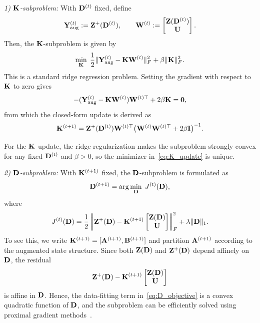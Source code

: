 \textit{1) $\mathbf{K}$-subproblem:}
With $\mathbf{D}^{(t)}$ fixed, define
\[
\mathbf{Y}_{\mathrm{aug}}^{(t)} := \mathbf{Z}^+(\mathbf{D}^{(t)}), \qquad
\mathbf{W}^{(t)} :=
\begin{bmatrix}
\mathbf{Z}(\mathbf{D}^{(t)}) \\ \mathbf{U}
\end{bmatrix}.
\]
Then, the $\mathbf{K}$-subproblem is given by
\[
\min_{\mathbf{K}} \;
\frac{1}{2}\|\mathbf{Y}_{\mathrm{aug}}^{(t)}
- \mathbf{K} \mathbf{W}^{(t)}\|_F^2
+ \beta\|\mathbf{K}\|_F^2 .
\]
This is a standard ridge regression problem. Setting the gradient with respect to $\mathbf{K}$ to zero gives
\[
-(\mathbf{Y}_{\mathrm{aug}}^{(t)} - \mathbf{K} \mathbf{W}^{(t)})
\mathbf{W}^{(t)\top} + 2\beta\mathbf{K} = \mathbf{0},
\]
from which the closed-form update is derived as
\begin{equation}
\label{eq:K_update}
\mathbf{K}^{(t+1)}
= \mathbf{Z}^+(\mathbf{D}^{(t)}) \mathbf{W}^{(t)\top}
\bigl( \mathbf{W}^{(t)} \mathbf{W}^{(t)\top} + 2\beta \mathbf{I} \bigr)^{-1}.
\end{equation}

For the $\mathbf{K}$ update, the ridge regularization makes the subproblem strongly convex for any fixed $\mathbf{D}^{(t)}$ and $\beta>0$, so the minimizer in~\eqref{eq:K_update} is unique.

\textit{2) $\mathbf{D}$-subproblem:} With $\mathbf{K}^{(t+1)}$ fixed, the $\mathbf{D}$-subproblem is formulated as
\begin{equation}
\label{eq:D_subproblem}
\mathbf{D}^{(t+1)} = \arg\min_{\mathbf{D}} \; J^{(t)}(\mathbf{D}),
\end{equation}
where
\begin{equation}
\label{eq:D_objective}
J^{(t)}(\mathbf{D}) = \frac{1}{2}\left\| \mathbf{Z}^+(\mathbf{D}) - \mathbf{K}^{(t+1)}
\begin{bmatrix}
\mathbf{Z}(\mathbf{D}) \\ \mathbf{U}
\end{bmatrix} \right\|_F^2
+ \lambda\|\mathbf{D}\|_1.
\end{equation}
To see this, we write $\mathbf{K}^{(t+1)} = [\mathbf{A}^{(t+1)},\mathbf{B}^{(t+1)}]$ and partition $\mathbf{A}^{(t+1)}$ according to the augmented state structure. Since both $\mathbf{Z}(\mathbf{D})$ and $\mathbf{Z}^+(\mathbf{D})$ depend affinely on $\mathbf{D}$, the residual
\[
\mathbf{Z}^+(\mathbf{D}) - \mathbf{K}^{(t+1)}
\begin{bmatrix}
\mathbf{Z}(\mathbf{D}) \\ \mathbf{U}
\end{bmatrix}
\]
is affine in $\mathbf{D}$. Hence, the data-fitting term in~\eqref{eq:D_objective} is a convex quadratic function of $\mathbf{D}$, and the subproblem can be efficiently solved using proximal gradient methods~\cite{Beck2009ISTA}.

